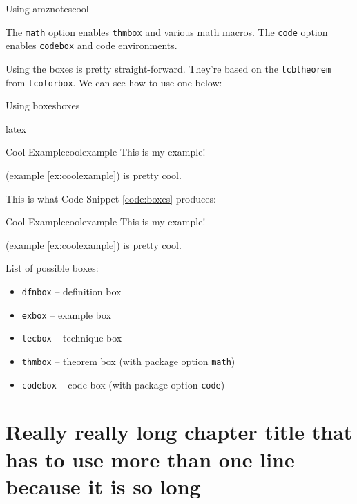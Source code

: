 \documentclass[12pt]{report}
\begin{document}
    \begin{codebox}{Using amznotes}{cool}
    \end{codebox}

    The \texttt{math} option enables \texttt{thmbox} and various math macros. The \texttt{code} option enables \texttt{codebox} and code environments.

    Using the boxes is pretty straight-forward. They're based on the \texttt{tcbtheorem} from \texttt{tcolorbox}. We can see how to use one below:
    \begin{codebox}{Using boxes}{boxes}
        \begin{amzcode}{latex}
            \begin{exbox}{Cool Example}{coolexample}
                This is my example!
            \end{exbox}
             (example \ref{ex:coolexample}) is pretty cool.
        \end{amzcode}
    \end{codebox}

    This is what Code Snippet \ref{code:boxes} produces:

    \begin{notebox}
        \begin{exbox}{Cool Example}{coolexample}
            This is my example!
        \end{exbox}
         (example \ref{ex:coolexample}) is pretty cool.
    \end{notebox}

    List of possible boxes:
    \begin{itemize}
        \item \texttt{dfnbox} -- definition box
        \item \texttt{exbox} -- example box
        \item \texttt{tecbox} -- technique box
        \item \texttt{thmbox} -- theorem box (with package option \texttt{math})
        \item \texttt{codebox} -- code box (with package option \texttt{code})

    \end{itemize}

    \chapter{Really really long chapter title that has to use more than one line because it is so long}
    \lipsum[100]
    \lipsum[101]

    \lipsum[102]

    \begin{notebox}
        \lipsum[21]
    \end{notebox}

    \lipsum[104]


    \amzindex
\end{document}
